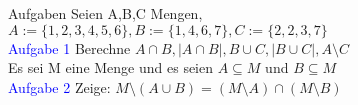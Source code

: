 \begin{frame}{Aufgaben}
 Seien A,B,C Mengen, $A := \{1, 2, 3, 4, 5, 6\}, B := \{1, 4, 6, 7\}, C := \{2, 2, 3, 7\}$\\
 \textcolor{blue}{Aufgabe 1} Berechne $A\cap B, \lvert A\cap B\rvert, B\cup C, \lvert B\cup C\rvert, A\setminus C$\\
 Es sei M eine Menge und es seien $A\subseteq M$ und $B\subseteq M$\\
 \textcolor{blue}{Aufgabe 2} Zeige: $M\setminus (A\cup B) = (M\setminus A)\cap (M\setminus B)$\\
\end{frame}

